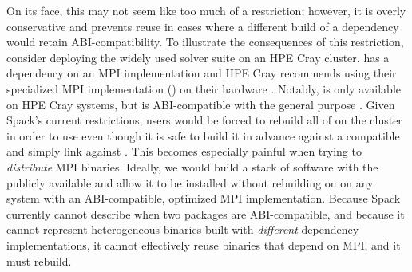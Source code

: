On its face, this may not seem like too much of a restriction; however, it is
overly conservative and prevents reuse in cases where a different build of a
dependency would retain ABI-compatibility. To illustrate the consequences of
this restriction, consider deploying the widely used solver suite
 \cite{trilinos-website} on an HPE Cray
cluster.  has a dependency on an MPI implementation and HPE
Cray recommends using their specialized MPI implementation ()
on their hardware \cite{cray-docs}.  Notably,  is only
available on HPE Cray systems, but is ABI-compatible with the general purpose
.  Given Spack's current restrictions,
users would be forced to rebuild all of  on the cluster in
order to use  even though it is safe to build it in advance
against a compatible  and simply link against
. This becomes especially painful when trying to {\it distribute}
MPI binaries. Ideally, we would build a stack of software with the publicly
available  and allow it to be installed without rebuilding on
on any system with an ABI-compatible, optimized MPI implementation. Because
Spack currently cannot describe when two packages are ABI-compatible,
and because it cannot represent heterogeneous binaries built with {\it different}
dependency implementations, it cannot effectively reuse binaries that depend
on MPI, and it must rebuild.

